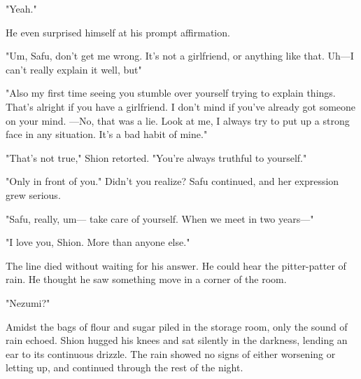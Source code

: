 "Yeah."

He even surprised himself at his prompt affirmation.

"Um, Safu, don't get me wrong. It's not a girlfriend, or anything like
that. Uh---I can't really explain it well, but\el "

"Also my first time seeing you stumble over yourself trying to explain
things. That's alright if you have a girlfriend. I don't mind if you've
already got someone on your mind. ---No, that was a lie. Look at me, I
always try to put up a strong face in any situation. It's a bad habit of
mine."

"That's not true," Shion retorted. "You're always truthful to yourself."

"Only in front of you." Didn't you realize? Safu continued, and her
expression grew serious.

"Safu, really, um--- take care of yourself. When we meet in two years---"

"I love you, Shion. More than anyone else."

The line died without waiting for his answer. He could hear the
pitter-patter of rain. He thought he saw something move in a corner of
the room.

"Nezumi?"

Amidst the bags of flour and sugar piled in the storage room, only the
sound of rain echoed. Shion hugged his knees and sat silently in the
darkness, lending an ear to its continuous drizzle. The rain showed no
signs of either worsening or letting up, and continued through the rest
of the night.